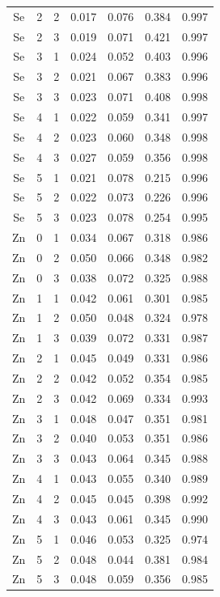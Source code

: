 \documentclass[ms, hidelinks]{uncgdissertationexp3}
\theoremstyle{plain}
\theoremstyle{definition}
\theoremstyle{remark}
\begin{document}
\begin{longtable}{ccccccc}
  Se & 2 & 2 & 0.017 & 0.076 & 0.384 & 0.997\\
  \rowcolor{gray!6}  Se & 2 & 3 & 0.019 & 0.071 & 0.421 & 0.997\\
  Se & 3 & 1 & 0.024 & 0.052 & 0.403 & 0.996\\
  \rowcolor{gray!6}  Se & 3 & 2 & 0.021 & 0.067 & 0.383 & 0.996\\
  Se & 3 & 3 & 0.023 & 0.071 & 0.408 & 0.998\\
  \rowcolor{gray!6}  Se & 4 & 1 & 0.022 & 0.059 & 0.341 & 0.997\\
  Se & 4 & 2 & 0.023 & 0.060 & 0.348 & 0.998\\
  \rowcolor{gray!6}  Se & 4 & 3 & 0.027 & 0.059 & 0.356 & 0.998\\
  Se & 5 & 1 & 0.021 & 0.078 & 0.215 & 0.996\\
  \rowcolor{gray!6}  Se & 5 & 2 & 0.022 & 0.073 & 0.226 & 0.996\\
  Se & 5 & 3 & 0.023 & 0.078 & 0.254 & 0.995\\
  \rowcolor{gray!6}  Zn & 0 & 1 & 0.034 & 0.067 & 0.318 & 0.986\\
  Zn & 0 & 2 & 0.050 & 0.066 & 0.348 & 0.982\\
  \rowcolor{gray!6}  Zn & 0 & 3 & 0.038 & 0.072 & 0.325 & 0.988\\
  Zn & 1 & 1 & 0.042 & 0.061 & 0.301 & 0.985\\
  \rowcolor{gray!6}  Zn & 1 & 2 & 0.050 & 0.048 & 0.324 & 0.978\\
  Zn & 1 & 3 & 0.039 & 0.072 & 0.331 & 0.987\\
  \rowcolor{gray!6}  Zn & 2 & 1 & 0.045 & 0.049 & 0.331 & 0.986\\
  Zn & 2 & 2 & 0.042 & 0.052 & 0.354 & 0.985\\
  \rowcolor{gray!6}  Zn & 2 & 3 & 0.042 & 0.069 & 0.334 & 0.993\\
  Zn & 3 & 1 & 0.048 & 0.047 & 0.351 & 0.981\\
  \rowcolor{gray!6}  Zn & 3 & 2 & 0.040 & 0.053 & 0.351 & 0.986\\
  Zn & 3 & 3 & 0.043 & 0.064 & 0.345 & 0.988\\
  \rowcolor{gray!6}  Zn & 4 & 1 & 0.043 & 0.055 & 0.340 & 0.989\\
  Zn & 4 & 2 & 0.045 & 0.045 & 0.398 & 0.992\\
  \rowcolor{gray!6}  Zn & 4 & 3 & 0.043 & 0.061 & 0.345 & 0.990\\
  Zn & 5 & 1 & 0.046 & 0.053 & 0.325 & 0.974\\
  \rowcolor{gray!6}  Zn & 5 & 2 & 0.048 & 0.044 & 0.381 & 0.984\\
  Zn & 5 & 3 & 0.048 & 0.059 & 0.356 & 0.985\\*
  \end{longtable}
\end{document}
